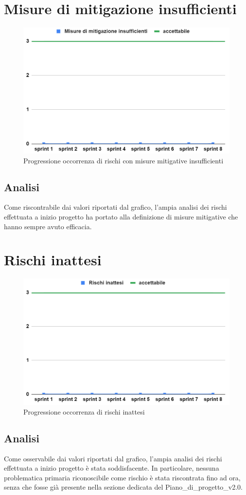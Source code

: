 \section{Misure di mitigazione insufficienti}
\begin{figure}[H]
    \centering
    \includegraphics[width=0.8\linewidth]{Mitigazioni.png}
    \caption{Progressione occorrenza di rischi con misure mitigative insufficienti}
\end{figure}
\subsection{Analisi}
Come riscontrabile dai valori riportati dal grafico, l'ampia analisi dei rischi effettuata a inizio progetto ha portato alla definizione di misure mitigative che hanno sempre avuto efficacia.

\section{Rischi inattesi}
\begin{figure}[H]
    \centering
    \includegraphics[width=0.8\linewidth]{Rischi.png}
    \caption{Progressione occorrenza di rischi inattesi}
\end{figure}
\subsection{Analisi}
Come osservabile dai valori riportati dal grafico, l'ampia analisi dei rischi effettuata a inizio progetto è stata soddisfacente. In particolare, nessuna problematica primaria riconoscibile come rischio è stata riscontrata fino ad ora, senza che fosse già presente nella sezione dedicata del Piano\_di\_progetto\_v2.0.


